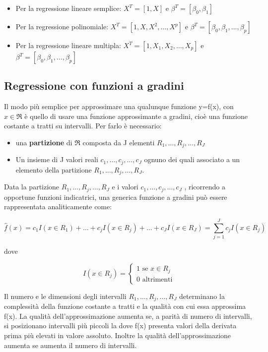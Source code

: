 \documentclass[a4paper]{extarticle}
\begin{document}
\begin{itemize}
\item Per la regressione lineare semplice: $X^T = [1,X]$ e $\beta^T = [ \beta_0, \beta_1 ]$
\item Per la regressione polinomiale: $X^T = [1,X,X^2,\dots,X^p]$ e $\beta^T = [\beta_0,\beta_1,\dots,\beta_p]$
\item Per la regressione lineare multipla: $X^T = [1,X_1,X_2,\dots,X_p]$ e $\beta^T = [\beta_0,\beta_1,\dots, \beta_p]$ 
\end{itemize}

\subsection{Regressione con funzioni a gradini}

Il modo più semplice per approssimare una qualunque funzione y=f(x), con $x \in \Re$ è quello di usare una funzione approssimante a gradini, cioè una funzione costante a tratti su intervalli. Per farlo è necessario:
\begin{itemize}
\item una \textbf{partizione} di $\Re$ composta da J elementi ${R_1, \dots, R_j,\dots, R_J}$
\item Un insieme di J valori reali ${c_1,\dots,c_j,\dots,c_J}$ ognuno dei quali associato a un elemento della partizione ${R_1, \dots, R_j,\dots, R_J}$.
\end{itemize}

Data la partizione ${R_1, \dots, R_j,\dots, R_J}$ e i valori ${c_1,\dots,c_j,\dots,c_J}$ , ricorrendo a opportune funzioni indicatrici, una generica funzione a gradini può essere rappresentata analiticamente come:

\begin{equation*}
\hat f(x) = c_1 I(x \in R_1) + \dots + c_j I(x \in R_j) + \dots + c_J I (x \in R_J) = \sum\limits_{j=1}^J c_j I (x \in R_j) 
\end{equation*}

dove

\begin{equation*}
I(x \in R_j) = 
\begin{cases}
		1 \text{ se } x \in R_j \\
		0 \text{ altrimenti}
	\end{cases}
\end{equation*}

Il numero e le dimensioni degli intervalli ${R_1, \dots, R_j,\dots, R_J}$ determinano la complessità della funzione costante a tratti e la qualità con cui essa approssima f(x). La qualità dell'approssimazione aumenta se, a parità di numero di intervalli, si posizionano intervalli più piccoli la dove f(x) presenta valori della derivata prima più elevati in valore assoluto. Inoltre la qualità dell'approssimazione aumenta se aumenta il numero di intervalli.
\end{document}
